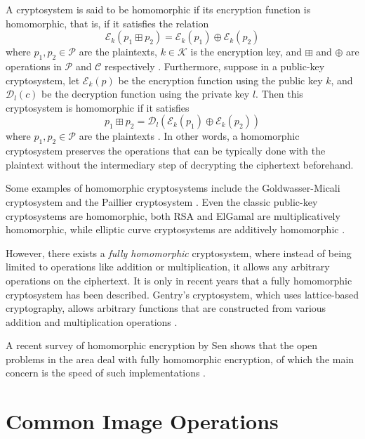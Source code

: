 A cryptosystem is said to be homomorphic if its encryption function is homomorphic, that is, if it satisfies the relation
\begin{equation}
    \mathcal{E}_k \left(p_1 \boxplus p_2\right) = \mathcal{E}_k \left(p_1\right) \oplus \mathcal{E}_k \left(p_2\right)
\end{equation}
where $p_1, p_2 \in \mathcal{P}$ are the plaintexts, $k \in \mathcal{K}$ is the encryption key, and $\boxplus$ and $\oplus$ are operations in $\mathcal{P}$ and $\mathcal{C}$ respectively \cite{fontaine_survey_2007}. Furthermore, suppose in a public-key cryptosystem, let $\mathcal{E}_k \left(p \right)$ be the encryption function using the public key $k$, and $\mathcal{D}_l \left(c \right)$ be the decryption function using the private key $l$. Then this cryptosystem is homomorphic if it satisfies
\begin{equation}
    p_1 \boxplus p_2 = \mathcal{D}_l \left( \mathcal{E}_k \left(p_1\right) \oplus \mathcal{E}_k \left(p_2\right) \right)
\end{equation}
where $p_1, p_2 \in \mathcal{P}$ are the plaintexts \cite{li_elliptic_2012}.
In other words, a homomorphic cryptosystem preserves the operations that can be typically done with the plaintext without the intermediary step of decrypting the ciphertext beforehand. 

Some examples of homomorphic cryptosystems include the Goldwasser-Micali cryptosystem \cite{goldwasser_probabilistic_1984} and the Paillier cryptosystem \cite{stern_public-key_1999}. Even the classic public-key cryptosystems are homomorphic, both RSA and ElGamal are multiplicatively homomorphic, while elliptic curve cryptosystems are additively homomorphic \cite{li_elliptic_2012}.

However, there exists a \textit{fully homomorphic} cryptosystem, where instead of being limited to operations like addition or multiplication, it allows any arbitrary operations on the ciphertext. It is only in recent years that a fully homomorphic cryptosystem has been described. Gentry's cryptosystem, which uses lattice-based cryptography, allows arbitrary functions that are constructed from various addition and multiplication operations \cite{gentry_fully_2009}. 

A recent survey of homomorphic encryption by Sen shows that the open problems in the area deal with fully homomorphic encryption, of which the main concern is the speed of such implementations \cite{sen_homomorphic_2013}.


\section{Common Image Operations}

